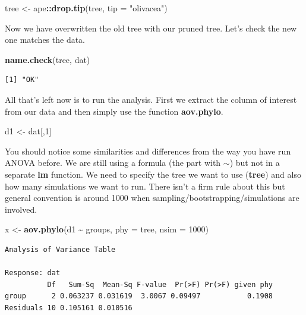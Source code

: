\documentclass[
]{book}
\newenvironment{Shaded}{\begin{snugshade}}{\end{snugshade}}
\newcommand{\DataTypeTok}[1]{\textcolor[rgb]{0.13,0.29,0.53}{#1}}
\newcommand{\DecValTok}[1]{\textcolor[rgb]{0.00,0.00,0.81}{#1}}
\newcommand{\KeywordTok}[1]{\textcolor[rgb]{0.13,0.29,0.53}{\textbf{#1}}}
\newcommand{\NormalTok}[1]{#1}
\newcommand{\OperatorTok}[1]{\textcolor[rgb]{0.81,0.36,0.00}{\textbf{#1}}}
\newcommand{\StringTok}[1]{\textcolor[rgb]{0.31,0.60,0.02}{#1}}
\begin{document}
\begin{Shaded}
\begin{Highlighting}[]
\NormalTok{tree \textless{}{-}}\StringTok{ }\NormalTok{ape}\OperatorTok{::}\KeywordTok{drop.tip}\NormalTok{(tree, }\DataTypeTok{tip =} \StringTok{"olivacea"}\NormalTok{)}
\end{Highlighting}
\end{Shaded}

Now we have overwritten the old tree with our pruned tree. Let's check the new one matches the data.

\begin{Shaded}
\begin{Highlighting}[]
\KeywordTok{name.check}\NormalTok{(tree, dat)}
\end{Highlighting}
\end{Shaded}

\begin{verbatim}
[1] "OK"
\end{verbatim}

All that's left now is to run the analysis. First we extract the column of interest from our data and then simply use the function \textbf{aov.phylo}.

\begin{Shaded}
\begin{Highlighting}[]
\NormalTok{d1 \textless{}{-}}\StringTok{ }\NormalTok{dat[,}\DecValTok{1}\NormalTok{]}
\end{Highlighting}
\end{Shaded}

You should notice some similarities and differences from the way you have run ANOVA before. We are still using a formula (the part with \(\sim\)) but not in a separate \textbf{lm} function. We need to specify the tree we want to use (\textbf{tree}) and also how many simulations we want to run. There isn't a firm rule about this but general convention is around 1000 when sampling/bootstrapping/simulations are involved.

\begin{Shaded}
\begin{Highlighting}[]
\NormalTok{x \textless{}{-}}\StringTok{ }\KeywordTok{aov.phylo}\NormalTok{(d1 }\OperatorTok{\textasciitilde{}}\StringTok{ }\NormalTok{groups, }\DataTypeTok{phy =}\NormalTok{ tree, }\DataTypeTok{nsim =} \DecValTok{1000}\NormalTok{)}
\end{Highlighting}
\end{Shaded}

\begin{verbatim}
Analysis of Variance Table

Response: dat
          Df   Sum-Sq  Mean-Sq F-value  Pr(>F) Pr(>F) given phy
group      2 0.063237 0.031619  3.0067 0.09497           0.1908
Residuals 10 0.105161 0.010516                                 
\end{verbatim}
\end{document}
